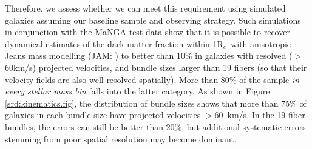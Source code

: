 \documentclass[preprint,11pt]{aastex}
\newcommand{\Reff}{{R$_{e}$}}
\begin{document}
Therefore, we assess whether we can meet this requirement using
simulated galaxies assuming our baseline sample and observing
strategy. Such simulations in conjunction with the MaNGA test data
show that it is possible to recover dynamical estimates of the dark
matter fraction within 1\Reff\ with anisotropic Jeans mass modelling
(JAM: \citealt{cappellari2008}) to better than 10\% in galaxies with
resolved ($>$60km/s) projected velocities, and bundle sizes larger
than 19 fibers (so that their velocity fields are also well-resolved
spatially). More than 80\% of the sample {\em in every stellar mass
  bin} falls into the latter category. As shown in Figure
\ref{srd:kinematics.fig}, the distribution of bundle sizes shows that
more than 75\% of galaxies in each bundle size have projected
velocities $>60$~km/s. In the 19-fiber bundles, the errors can still
be better than 20\%, but additional systematic errors stemming from
poor spatial resolution may become dominant.


\end{document}
